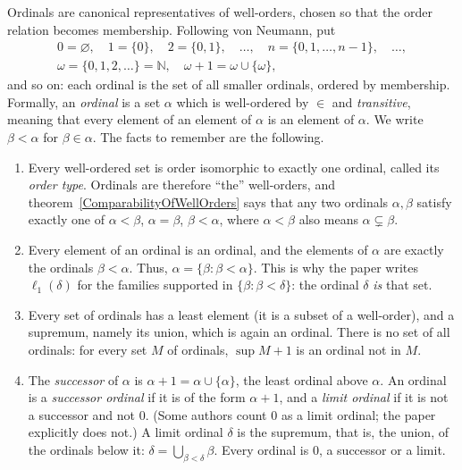 \documentclass[12pt]{article}
\theoremstyle{definition}
\theoremstyle{remark}
\newcommand{\ellone}[1]{\ell_1(#1)}
\newcommand{\NN}{\mathbb{N}}
\begin{document}
Ordinals are canonical representatives of well-orders, chosen so that the
order relation becomes membership. Following von Neumann, put
\begin{gather*}
0=\varnothing,\quad 1=\{0\},\quad 2=\{0,1\},\quad\ldots,\quad
n=\{0,1,\ldots,n-1\},\quad\ldots,\\
\omega=\{0,1,2,\ldots\}=\NN,\quad \omega+1=\omega\cup\{\omega\},
\end{gather*}
and so on: each ordinal is the set of all smaller ordinals, ordered by
membership. Formally, an \emph{ordinal} is a set $\alpha$ which is well-ordered
by $\in$ and \emph{transitive}, meaning that every element of an element of
$\alpha$ is an element of $\alpha$. We write $\beta<\alpha$ for
$\beta\in\alpha$. The facts to remember are the following.
\begin{enumerate}[label = (\alph*)]
    \item Every well-ordered set is order isomorphic to exactly one ordinal,
          called its \emph{order type}. Ordinals are therefore ``the''
          well-orders, and theorem~\ref{ComparabilityOfWellOrders} says that
          any two ordinals $\alpha,\beta$ satisfy exactly one of
          $\alpha<\beta$, $\alpha=\beta$, $\beta<\alpha$, where $\alpha<\beta$
          also means $\alpha\subsetneq\beta$.
    \item Every element of an ordinal is an ordinal, and the elements of
          $\alpha$ are exactly the ordinals $\beta<\alpha$. Thus,
          $\alpha=\{\beta:\beta<\alpha\}$. This is why the paper writes
          $\ellone{\delta}$ for the families supported in
          $\{\beta:\beta<\delta\}$: the ordinal $\delta$ \emph{is} that set.
    \item Every set of ordinals has a least element (it is a subset of a
          well-order), and a supremum, namely its union, which is again an
          ordinal. There is no set of all ordinals: for every set $M$ of
          ordinals, $\sup M+1$ is an ordinal not in $M$.
    \item The \emph{successor} of $\alpha$ is $\alpha+1=\alpha\cup\{\alpha\}$,
          the least ordinal above $\alpha$. An ordinal is a \emph{successor
          ordinal} if it is of the form $\alpha+1$, and a \emph{limit
          ordinal} if it is not a successor and not $0$. (Some authors count
          $0$ as a limit ordinal; the paper explicitly does not.) A limit
          ordinal $\delta$ is the supremum, that is, the union, of the ordinals
          below it: $\delta=\bigcup_{\beta<\delta}\beta$. Every ordinal is
          $0$, a successor or a limit.
\end{enumerate}
\end{document}
